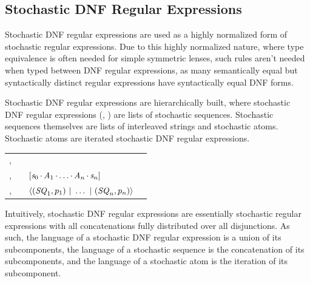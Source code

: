 \documentclass[acmsmall,screen,anonymous]{acmart}
\begin{document}
\subsection{Stochastic DNF Regular Expressions}
Stochastic DNF regular expressions are used as a highly normalized form of
stochastic regular expressions. Due to this highly normalized nature, where type
equivalence is often needed for simple symmetric lenses, such rules aren't
needed when typed between DNF regular expressions, as many semantically equal
but syntactically distinct regular expressions have syntactically equal DNF
forms.

Stochastic DNF regular expressions are hierarchically built, where stochastic
DNF regular expressions (\DNFRegex, \DNFRegexAlt) are lists of stochastic sequences. Stochastic sequences
themselves are lists of interleaved strings and stochastic atoms.  Stochastic
atoms are iterated stochastic DNF regular expressions.
\begin{center}
  \begin{tabular}{l@{\ }c@{\ }l@{\ }>{\itshape\/}r}
    \Atom{},\AtomAlt{} & \GEq{} & \PRegexStar{\DNFRegex{}}{\Probability}
\\
    \Sequence{},\SequenceAlt{} & \GEq{} &
                                                       $[\mathit{s}_0\mkern-1mu\cdot\mkern-1mu\mathit{A}_1\mkern-1mu\cdot\mkern-1mu\ldots\mkern-1mu\cdot\mkern-1mu\mathit{A}_n\mkern-1mu\cdot\mkern-1mu\mathit{s}_n]$ 
\\
    \DNFRegex{},\DNFRegexAlt{} & \GEq{} & $\langle(\mathit{SQ}_1,p_1)~|~\ldots~|~(\mathit{SQ}_n,p_n)\rangle$ %
  \end{tabular}
\end{center}

Intuitively, stochastic DNF regular expressions are essentially stochastic
regular expressions with all concatenations fully distributed over all
disjunctions. As such, the language of a stochastic DNF regular expression is a
union of its subcomponents, the language of a stochastic sequence is the
concatenation of its subcomponents, and the language of a stochastic atom is the
iteration of its subcomponent.
\end{document}

